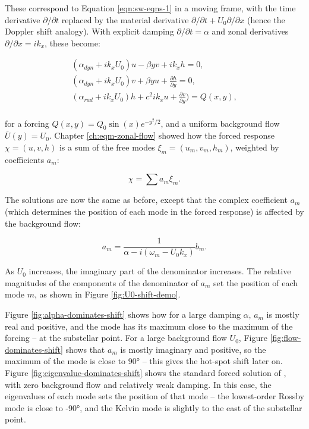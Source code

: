  These correspond to Equation \ref{eqn:sw-eqns-1} in a moving frame, with the time derivative $\partial/\partial t$ replaced by the material derivative $\partial/\partial t + U_{0} \partial / \partial x$ (hence the Doppler shift analogy). With explicit damping $\partial / \partial t = \alpha$ and zonal derivatives $\partial / \partial x = i k_{x}$, these become:

 \begin{equation}\label{eqn:sw-eqns-forced-U0}
   \begin{gathered}
     (\alpha_{dyn} + i k_{x} U_{0}) u - \beta y v +  i k_{x}h = 0, \\
     (\alpha_{dyn} + i k_{x} U_{0}) v + \beta y u + \frac{\partial h}{\partial y} = 0, \\
     (\alpha_{rad} + i k_{x} U_{0}) h + c^{2} i k_{x}u + \frac{\partial v}{\partial y}) = Q(x,y), \\
   \end{gathered}
 \end{equation}

 for a forcing $Q(x,y) = Q_{0} \sin(x) e^{-y^{2}/2}$, and a uniform background flow $\overline{U}(y) = U_{0}$. Chapter \ref{ch:eqm-zonal-flow} showed how the forced response $\chi = (u,v,h)$ is a sum of the free modes $\xi_{m}=(u_{m},v_{m},h_{m})$, weighted by coefficients $a_{m}$:

\begin{equation}
  \chi = \sum a _ { m } \xi _ { m }.
\end{equation}

The solutions are now the same as before, except that the complex coefficient $a_{m}$ (which determines the position of each mode in the forced response) is affected by the background flow:

\begin{equation}\label{eqn:am-U0}
  a _ { m } = \frac { 1 } { \alpha - i (\omega _ { m } - U_{0}k_{x})} b _ { m}.
\end{equation}

As $U_{0}$ increases, the imaginary part of the denominator increases. The relative magnitudes of the components of the denominator of $a_{m}$ set the position of each mode $m$, as shown in Figure \ref{fig:U0-shift-demo}.

Figure \ref{fig:alpha-dominates-shift} shows how for a large damping $\alpha$, $a_{m}$ is mostly real and positive, and the mode has its maximum close to the maximum of the forcing -- at the substellar point. For a large background flow $U_{0}$, Figure \ref{fig:flow-dominates-shift} shows that $a_{m}$ is mostly imaginary and positive, so the maximum of the mode is close to \ang{+90} -- this gives the hot-spot shift later on. Figure \ref{fig:eigenvalue-dominates-shift} shows the standard forced solution of \citet{matsuno1966quasi}, with zero background flow and relatively weak damping. In this case, the eigenvalues of each mode sets the position of that mode  -- the lowest-order Rossby mode is close to \ang{-90}, and the Kelvin mode is slightly to the east of the substellar point.


